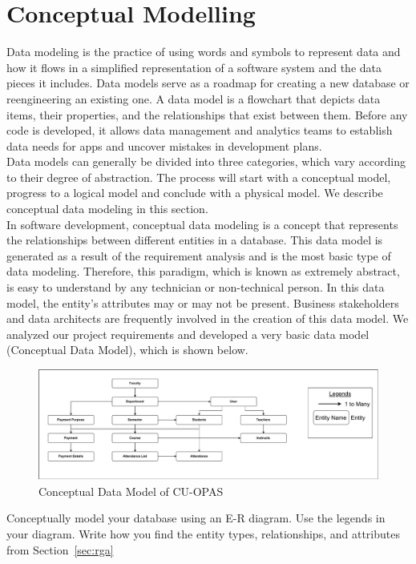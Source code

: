 \section{Conceptual Modelling}\label{sec:cm}

Data modeling is the practice of using words and symbols to represent data and how it flows in a simplified representation of a software system and the data pieces it includes. Data models serve as a roadmap for creating a new database or reengineering an existing one. A data model is a flowchart that depicts data items, their properties, and the relationships that exist between them. Before any code is developed, it allows data management and analytics teams to establish data needs for apps and uncover mistakes in development plans.\\
Data models can generally be divided into three categories, which vary according to their degree of abstraction. The process will start with a conceptual model, progress to a logical model and conclude with a physical model. We describe conceptual data modeling in this section.\\

In software development, conceptual data modeling is a concept that represents the relationships between different entities in a database. This data model is generated as a result of the requirement analysis and is the most basic type of data modeling. Therefore, this paradigm, which is known as extremely abstract, is easy to understand by any technician or non-technical person. In this data model, the entity's attributes may or may not be present. Business stakeholders and data architects are frequently involved in the creation of this data model. 
We analyzed our project requirements and developed a very basic data model (Conceptual Data Model), which is shown below.

\begin{figure}[H]
    \centering
    \includegraphics[width=1\textwidth]{images/conceptual}
    \caption{Conceptual Data Model of CU-OPAS}
    \label{fig:archi}
\end{figure}

Conceptually model your database using an E-R diagram. Use the legends in your diagram. Write how you find the entity types, relationships, and attributes from Section~\ref{sec:rga}